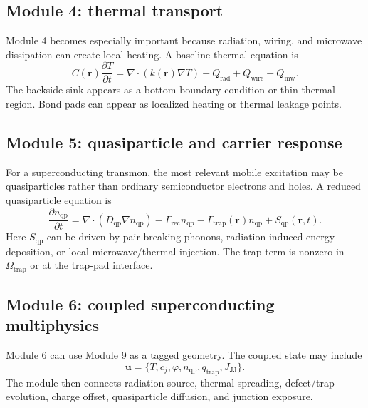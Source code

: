 \documentclass[11pt]{article}
\begin{document}
\subsection{Module 4: thermal transport}
Module 4 becomes especially important because radiation, wiring, and microwave dissipation can create local heating. A baseline thermal equation is
\begin{equation}
    C(\mathbf{r})\frac{\partial T}{\partial t}=\nabla\cdot(k(\mathbf{r})\nabla T)+Q_{\mathrm{rad}}+Q_{\mathrm{wire}}+Q_{\mathrm{mw}}.
\end{equation}
The backside sink appears as a bottom boundary condition or thin thermal region. Bond pads can appear as localized heating or thermal leakage points.

\subsection{Module 5: quasiparticle and carrier response}
For a superconducting transmon, the most relevant mobile excitation may be quasiparticles rather than ordinary semiconductor electrons and holes. A reduced quasiparticle equation is
\begin{equation}
    \frac{\partial n_{\mathrm{qp}}}{\partial t}
    = \nabla\cdot(D_{\mathrm{qp}}\nabla n_{\mathrm{qp}})
    - \Gamma_{\mathrm{rec}}n_{\mathrm{qp}}
    - \Gamma_{\mathrm{trap}}(\mathbf{r})n_{\mathrm{qp}}
    + S_{\mathrm{qp}}(\mathbf{r},t).
\end{equation}
Here $S_{\mathrm{qp}}$ can be driven by pair-breaking phonons, radiation-induced energy deposition, or local microwave/thermal injection. The trap term is nonzero in $\Omega_{\mathrm{trap}}$ or at the trap-pad interface.

\subsection{Module 6: coupled superconducting multiphysics}
Module 6 can use Module 9 as a tagged geometry. The coupled state may include
\begin{equation}
    \mathbf{u}=\{T, c_j, \varphi, n_{\mathrm{qp}}, q_{\mathrm{trap}}, J_{\mathrm{JJ}}\}.
\end{equation}
The module then connects radiation source, thermal spreading, defect/trap evolution, charge offset, quasiparticle diffusion, and junction exposure.
\end{document}
